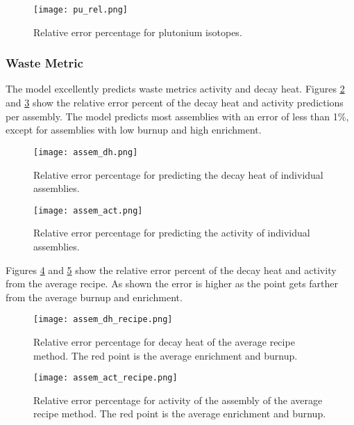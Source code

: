 \begin{figure}
    \centering
    \texttt{[image: pu\_rel.png]}
    \caption{Relative error percentage for plutonium isotopes.}
    \label{fig:pu_rel}
\end{figure}

\FloatBarrier


\subsubsection{Waste Metric}
The model excellently predicts waste metrics activity
and decay heat. Figures \ref{fig:assem_dh} and \ref{fig:assem_act}
show the relative error percent of the decay heat and activity
predictions per assembly. The model predicts most assemblies
with an error of less than 1\%, except for assemblies with low
burnup and high enrichment.


\begin{figure}
    \centering
    \texttt{[image: assem\_dh.png]}
    \caption{Relative error percentage for predicting the decay
             heat of individual assemblies.}
    \label{fig:assem_dh}
\end{figure}


\begin{figure}
    \centering
    \texttt{[image: assem\_act.png]}
    \caption{Relative error percentage for predicting the
             activity of individual assemblies.}
    \label{fig:assem_act}
\end{figure}


Figures \ref{fig:assem_dh_recipe} and
\ref{fig:assem_act_recipe} show the relative error percent
of the decay heat and activity from the average recipe.
As shown the error is higher as the point gets farther from
the average burnup and enrichment.



\begin{figure}
    \centering
    \texttt{[image: assem\_dh\_recipe.png]}
    \caption{Relative error percentage for decay heat
             of the average recipe
             method. The red point is the average enrichment and
             burnup.}
    \label{fig:assem_dh_recipe}
\end{figure}

\begin{figure}
    \centering
    \texttt{[image: assem\_act\_recipe.png]}
    \caption{Relative error percentage for activity
             of the assembly of the average recipe
             method. The red point is the average enrichment and
             burnup.}
    \label{fig:assem_act_recipe}
\end{figure}

